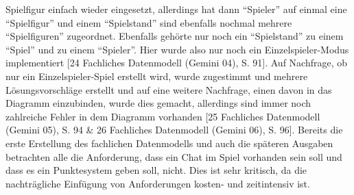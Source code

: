 Spielfigur einfach wieder eingesetzt, allerdings hat dann ``Spieler'' auf einmal eine ``Spielfigur'' und einem ``Spielstand'' sind 
ebenfalls nochmal mehrere ``Spielfiguren'' zugeordnet. Ebenfalls gehörte nur noch ein ``Spielstand'' zu einem ``Spiel'' und zu einem 
``Spieler''. Hier wurde also nur noch ein Einzelspieler-Modus implementiert [24 Fachliches Datenmodell (Gemini 04), S. 91]. Auf 
Nachfrage, ob nur ein Einzelspieler-Spiel erstellt wird, wurde zugestimmt und mehrere Lösungsvorschläge erstellt und auf eine 
weitere Nachfrage, einen davon in das Diagramm einzubinden, wurde dies gemacht, allerdings sind immer noch zahlreiche Fehler 
in dem Diagramm vorhanden [25 Fachliches Datenmodell (Gemini 05), S. 94 \& 26 Fachliches Datenmodell (Gemini 06), S. 96]. Bereits 
die erste Erstellung des fachlichen Datenmodells und auch die späteren Ausgaben betrachten alle die Anforderung, dass ein Chat 
im Spiel vorhanden sein soll und dass es ein Punktesystem geben soll, nicht. Dies ist sehr kritisch, da die nachträgliche Einfügung 
von Anforderungen kosten- und zeitintensiv ist.


